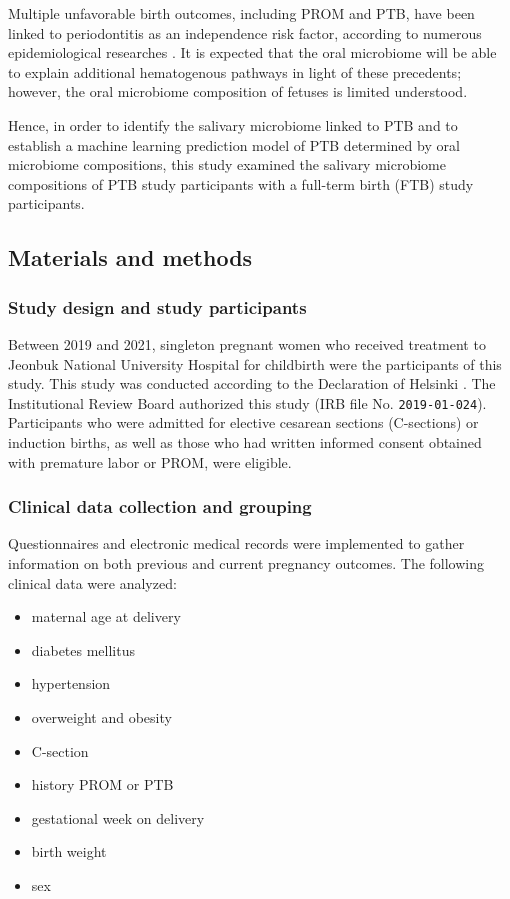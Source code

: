 \documentclass[11pt, a4paper, onecolumn, oneside]{report}
\begin{document}
            Multiple unfavorable birth outcomes, including PROM and PTB, have been linked to periodontitis as an independence risk factor, according to numerous epidemiological researches \cite{PTB-mechanism-5}. It is expected that the oral microbiome will be able to explain additional hematogenous pathways in light of these precedents; however, the oral microbiome composition of fetuses is limited understood.

            Hence, in order to identify the salivary microbiome linked to PTB and to establish a machine learning prediction model of PTB determined by oral microbiome compositions, this study examined the salivary microbiome compositions of PTB study participants with a full-term birth (FTB) study participants.
        \newpage

        \subsection{Materials and methods}
            \subsubsection{Study design and study participants}
                Between 2019 and 2021, singleton pregnant women who received treatment to Jeonbuk National University Hospital for childbirth were the participants of this study. This study was conducted according to the Declaration of Helsinki \cite{Helsinki-1}. The Institutional Review Board authorized this study (IRB file No. \texttt{2019-01-024}). Participants who were admitted for elective cesarean sections (C-sections) or induction births, as well as those who had written informed consent obtained with premature labor or PROM, were eligible.

            \subsubsection{Clinical data collection and grouping}
                Questionnaires and electronic medical records were implemented to gather information on both previous and current pregnancy outcomes. The following clinical data were analyzed:
                \begin{itemize}[noitemsep, nolistsep]
                    \item maternal age at delivery
                    \item diabetes mellitus
                    \item hypertension
                    \item overweight and obesity
                    \item C-section
                    \item history PROM or PTB
                    \item gestational week on delivery
                    \item birth weight
                    \item sex
                \end{itemize}
\end{document}
